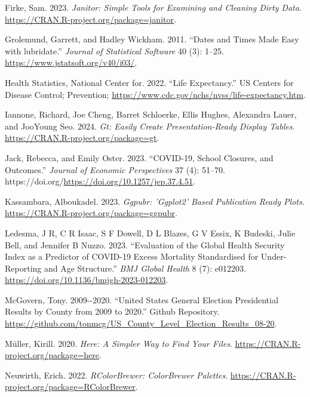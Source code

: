 \documentclass[
  letterpaper,
  DIV=11,
  numbers=noendperiod]{scrartcl}
\newlength{\cslhangindent}
\newlength{\cslentryspacingunit} %
\newenvironment{CSLReferences}[2] %
 {%
  \setlength{\parindent}{0pt}
  \ifodd #1
  \let\oldpar\par
  \def\par{\hangindent=\cslhangindent\oldpar}
  \fi
  \setlength{\parskip}{#2\cslentryspacingunit}
 }%
 {}
\begin{document}
\begin{CSLReferences}{1}{0}
\leavevmode{}%
Firke, Sam. 2023. \emph{Janitor: Simple Tools for Examining and Cleaning
Dirty Data}. \url{https://CRAN.R-project.org/package=janitor}.

\leavevmode{}%
Grolemund, Garrett, and Hadley Wickham. 2011. {``Dates and Times Made
Easy with {lubridate}.''} \emph{Journal of Statistical Software} 40 (3):
1--25. \url{https://www.jstatsoft.org/v40/i03/}.

\leavevmode{}%
Health Statistics, National Center for. 2022. {``Life Expectancy.''} US
Centers for Disease Control; Prevention;
\url{https://www.cdc.gov/nchs/nvss/life-expectancy.htm}.

\leavevmode{}%
Iannone, Richard, Joe Cheng, Barret Schloerke, Ellis Hughes, Alexandra
Lauer, and JooYoung Seo. 2024. \emph{Gt: Easily Create
Presentation-Ready Display Tables}.
\url{https://CRAN.R-project.org/package=gt}.

\leavevmode{}%
Jack, Rebecca, and Emily Oster. 2023. {``COVID-19, School Closures, and
Outcomes.''} \emph{Journal of Economic Perspectives} 37 (4): 51--70.
https://doi.org/\url{https://doi.org/10.1257/jep.37.4.51}.

\leavevmode{}%
Kassambara, Alboukadel. 2023. \emph{Ggpubr: 'Ggplot2' Based Publication
Ready Plots}. \url{https://CRAN.R-project.org/package=ggpubr}.

\leavevmode{}%
Ledesma, J R, C R Isaac, S F Dowell, D L Blazes, G V Essix, K Budeski,
Julie Bell, and Jennifer B Nuzzo. 2023. {``Evaluation of the Global
Health Security Index as a Predictor of COVID-19 Excess Mortality
Standardised for Under-Reporting and Age Structure.''} \emph{BMJ Global
Health} 8 (7): e012203. \url{https://doi.org/10.1136/bmjgh-2023-012203}.

\leavevmode{}%
McGovern, Tony. 2009-\/-2020. {``United States General Election
Presidential Results by County from 2009 to 2020.''} Github Repository.
\url{https://github.com/tonmcg/US_County_Level_Election_Results_08-20}.

\leavevmode{}%
Müller, Kirill. 2020. \emph{Here: A Simpler Way to Find Your Files}.
\url{https://CRAN.R-project.org/package=here}.

\leavevmode{}%
Neuwirth, Erich. 2022. \emph{RColorBrewer: ColorBrewer Palettes}.
\url{https://CRAN.R-project.org/package=RColorBrewer}.


\end{CSLReferences}
\end{document}
